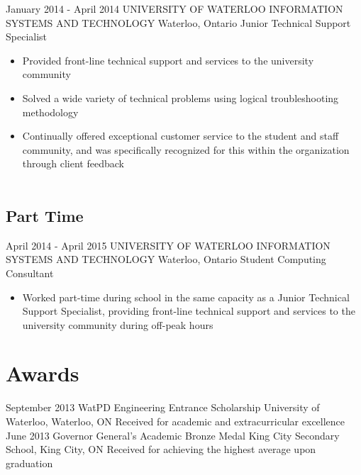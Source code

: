 \documentclass[hidelinks]{kkurucz-cv}
\begin{document}
\begin{entrylist}
\entry
{January 2014 - April 2014}
{UNIVERSITY OF WATERLOO INFORMATION SYSTEMS AND TECHNOLOGY}
{Waterloo, Ontario}
{Junior Technical Support Specialist}
{
\begin{itemize}
	\item Provided front-line technical support and services to the university community
	\item Solved a wide variety of technical problems using logical troubleshooting methodology
	\item Continually offered exceptional customer service to the student and staff community, and was specifically recognized for this within the organization through client feedback
\\
\\
\end{itemize}
}
\end{entrylist}

\subsection{Part Time}

\begin{entrylist}
\entry
{April 2014 - April 2015}
{UNIVERSITY OF WATERLOO INFORMATION SYSTEMS AND TECHNOLOGY}
{Waterloo, Ontario}
{Student Computing Consultant}
{
\begin{itemize}
	\item Worked part-time during school in the same capacity as a Junior Technical Support Specialist, providing front-line technical support and services to the university community during off-peak hours
\end{itemize}
}
\end{entrylist}


\section{Awards}

\begin{entrylist}
\entry
{September 2013}
{WatPD Engineering Entrance Scholarship}
{University of Waterloo, Waterloo, ON}
{Received for academic and extracurricular excellence}
{\null}
\entry
{June 2013}
{Governor General's Academic Bronze Medal}
{King City Secondary School, King City, ON}
{Received for achieving the highest average upon graduation}
{\null}
\end{entrylist}
\end{document}
